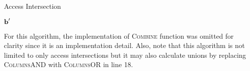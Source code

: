 \begin{algorithm}[h] 
    \caption{Access Intersection} 
    \label{alg:access-intersection}
    \begin{algorithmic}[1]




	     

	     

		 
		
		\Else
		\EndIf


	    \EndWhile 


	     

	\State \Return $\bm{\mathrm{b}}'$
	\EndFunction
    \end{algorithmic}


\end{algorithm}

For this algorithm, the implementation of \textsc{Combine} function was omitted
for clarity since it is an implementation detail. Also, note that this
algorithm is not limited to only access intersections but it may also calculate
unions by replacing \textsc{ColumnsAND} with \textsc{ColumnsOR} in line 18.


